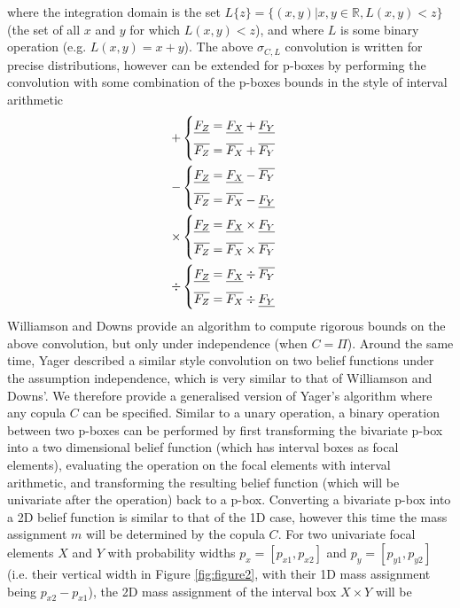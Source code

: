 \documentclass{juliacon}
\begin{document}
where the integration domain is the set $L\{z\} = \{(x,y)| x,y \in \mathbb{R}, L(x,y) < z\}$ (the set of all $x$ and $y$ for which $L(x,y) < z$), and where $L$ is some binary operation (e.g. $L(x,y) = x+y$). The above $\sigma_{C,L}$ convolution is written for precise distributions, however can be extended for p-boxes by performing the convolution with some combination of the p-boxes bounds in the style of interval arithmetic
\begin{eqnarray*}
  + 
  \begin{cases}
    \underline{F_Z} = \underline{F_X} + \underline{F_Y} \vspace{2mm}\\
    \overline{F_Z} = \overline{F_X} + \overline{F_Y}
  \end{cases}
  \\
  -\begin{cases}
    \underline{F_Z} = \underline{F_X} - \overline{F_Y}\vspace{2mm}\\
    \overline{F_Z} = \overline{F_X} - \underline{F_Y}
  \end{cases}
  \\
  \times
  \begin{cases}
    \underline{F_Z} = \underline{F_X} \times \underline{F_Y}\vspace{2mm}\\
    \overline{F_Z} = \overline{F_X} \times \overline{F_Y}
  \end{cases}
  \\
  \div
  \begin{cases}
    \underline{F_Z} = \underline{F_X} \div \overline{F_Y}\vspace{2mm}\\
    \overline{F_Z} = \overline{F_X} \div \underline{F_Y}
  \end{cases}
\end{eqnarray*}
Williamson and Downs provide an algorithm to compute rigorous bounds on the above convolution, but only under independence (when $C = \Pi$). Around the same time, Yager \cite{yager1986arithmetic} described a similar style convolution on two belief functions under the assumption independence, which is very similar to that of Williamson and Downs'. We therefore provide a generalised version of Yager's algorithm where any copula $C$ can be specified. Similar to a unary operation, a binary operation between two p-boxes can be performed by first transforming the bivariate p-box into a two dimensional belief function (which has interval boxes as focal elements), evaluating the operation on the focal elements with interval arithmetic, and transforming the resulting belief function (which will be univariate after the operation) back to a p-box. Converting a bivariate p-box into a 2D belief function is similar to that of the 1D case, however this time the mass assignment $m$ will be determined by the copula $C$. For two univariate focal elements $X$ and $Y$ with probability widths $p_{x} = [p_{x1}, p_{x2}]$ and $p_{y} = [p_{y1}, p_{y2}]$ (i.e. their vertical width in Figure \ref{fig:figure2}, with their 1D mass assignment being $p_{x2} - p_{x1}$), the 2D mass assignment of the interval box $X \times Y$ will be
\end{document}
